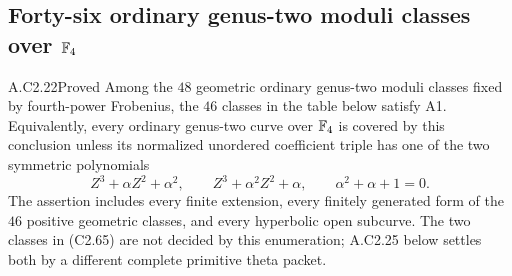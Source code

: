 \subsection{Forty-six ordinary genus-two moduli classes over \texorpdfstring{$\mathbb F_4$}{F4}}

\begin{claim}{A.C2.22}{Proved}
Among the $48$ geometric ordinary genus-two moduli
classes fixed by fourth-power Frobenius, the $46$
classes in the table below satisfy A1.
Equivalently, every ordinary genus-two curve over
$\mathbb F_4$ is covered by this conclusion unless its
normalized unordered coefficient triple has one
of the two symmetric polynomials
\[
 Z^3+\alpha Z^2+\alpha^2,\qquad
 Z^3+\alpha^2Z^2+\alpha,\qquad \alpha^2+\alpha+1=0.              \tag{C2.65}
\]
The assertion includes every finite extension,
every finitely generated form of the $46$
positive geometric classes, and every hyperbolic
open subcurve. The two classes in (C2.65) are not
decided by this enumeration; A.C2.25 below settles
both by a different complete primitive theta packet.
\end{claim}
